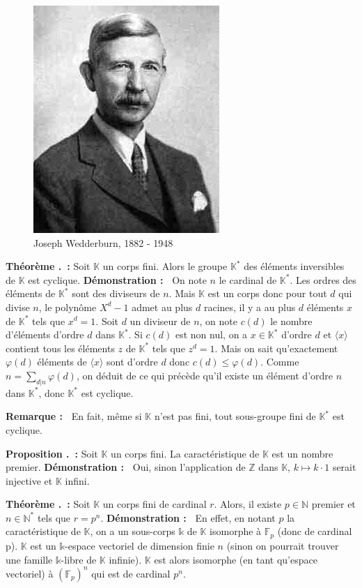 \documentclass[5pt,a4paper]{article}
\newcounter{prop}[section]
\newcounter{thm}[section]
\renewcommand{\theprop}{\thesection.\arabic{prop}}
\renewcommand{\thethm}{\thesection.\arabic{thm}}
\newcommand{\prop}[1]{\stepcounter{prop}\noindent\textbf{Proposition \theprop ~:} #1 \newline}
\newcommand{\thm}[1]{\stepcounter{thm}\noindent\textbf{Théorème \thethm ~:} #1 \newline}
\newcommand{\demo}[1]{\textbf{Démonstration :~} #1 \newline}
\newcommand{\rmq}[1]{\textbf{Remarque :~} #1 \newline}
\begin{document}
\begin{onehalfspacing}
\begin{figure}[!h]
\centering
\includegraphics[width = 0.25\linewidth]{ressources/wedderburn.jpeg}
\caption{Joseph Wedderburn, 1882 - 1948}
\end{figure}


\thm{Soit $\mathbb{K}$ un corps fini. Alors le groupe $\mathbb{K}^*$ des éléments inversibles de $\mathbb{K}$ est cyclique.}
\demo{On note $n$ le cardinal de $\mathbb{K^*}$. Les ordres des éléments de $\mathbb{K^*}$ sont des diviseurs de $n$. Mais $\mathbb{K}$ est un corps donc pour tout $d$ qui divise $n$, le polynôme $X^d - 1$ admet au plus $d$ racines, il y a au plus $d$ éléments $x$ de $\mathbb{K^*}$ tels que $x^d = 1$. Soit $d$ un diviseur de $n$, on note $c(d)$ le nombre d'éléments d'ordre $d$ dans $\mathbb{K^*}$. Si $c(d)$ est non nul, on a $x \in \mathbb{K}^*$ d'ordre $d$ et $\langle x \rangle$ contient tous les éléments $z$ de $\mathbb{K^*}$ tels que $z^d = 1$. Mais on sait qu'exactement $\varphi(d)$ éléments de $\langle x \rangle$ sont d'ordre $d$ donc $c(d) \leq   \varphi(d)$.  Comme $n = \sum_{d|n} \varphi(d)$, on déduit de ce qui précède qu'il existe un élément d'ordre $n$ dans $\mathbb{K^*}$, donc $\mathbb{K^*}$ est cyclique.}


\rmq{En fait, même si $\mathbb{K}$ n'est pas fini, tout sous-groupe fini de $\mathbb{K^*}$ est cyclique.}


\prop{Soit $\mathbb{K}$ un corps fini. La caractéristique de $\mathbb{K}$ est un nombre premier.}
\demo{Oui, sinon l'application de $\mathbb{Z}$ dans $\mathbb{K}$, $k \mapsto k \cdot 1$ serait injective et $\mathbb{K}$ infini.}


\thm{Soit $\mathbb{K}$ un corps fini de cardinal $r$. Alors, il existe $p \in \mathbb{N}$ premier et $n \in \mathbb{N}^{*}$ tels que $r = p^n$.}
\demo{En effet, en notant $p$ la caractéristique de $\mathbb{K}$, on  a un sous-corps $\mathds{k}$ de $\mathbb{K}$ isomorphe à $\mathbb{F}_{p}$ (donc de cardinal p). $\mathbb{K}$ est un $\mathds{k}$-espace vectoriel de dimension finie $n$ (sinon on pourrait trouver une famille $\mathds{k}$-libre de $\mathbb{K}$ infinie). $\mathbb{K}$ est alors isomorphe (en tant qu'espace vectoriel) à $(\mathbb{F}_{p})^n$ qui est de cardinal $p^n$.}



\end{onehalfspacing}
\end{document}
